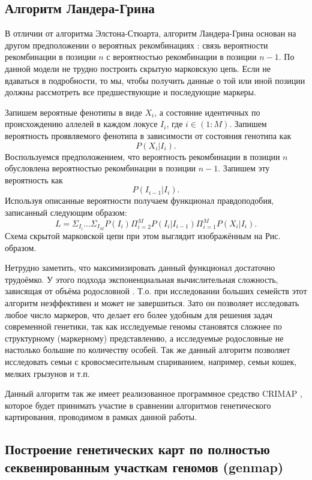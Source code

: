 \documentclass{matmex-diploma-custom}
\begin{document}
\subsection{Алгоритм Ландера-Грина}

В отличии от алгоритма Элстона-Стюарта, алгоритм Ландера-Грина основан
на другом предположении о вероятных рекомбинациях
\cite{lander1987construction}: связь вероятности рекомбинации в
позиции $n$ с вероятностью рекомбинации в позиции $n-1$. По данной
модели не трудно построить скрытую марковскую цепь. Если не вдаваться
в подробности, то мы, чтобы получить данные о той или иной позиции
должны рассмотреть все предшествующие и последующие маркеры.

Запишем вероятные фенотипы в виде $X_{i}$, а состояние идентичных по
происхождению аллелей в каждом локусе $I_{i}$, где $i \in
(1:M)$. Запишем вероятность проявляемого фенотипа в зависимости от
состояния генотипа как $$P( X_{i} | I_{i}).$$ Воспользуемся
предположением, что вероятность рекомбинации в позиции $n$ обусловлена
вероятностью рекомбинации в позиции $n-1$. Запишем эту вероятность
как $$P(I_{i-1}|I_{i}).$$ Используя описанные вероятности получаем
функционал правдоподобия, записанный следующим образом: $$L =
\Sigma_{I_{i}}...\Sigma_{I_{M}}P(I_{i})\Pi_{i=2}^{M}P(I_{i}|I_{i-1})\Pi^{M}_{i=1}P(X_{i}|I_{i}).$$
Схема скрытой марковской цепи при этом выглядит изображённым на
Рис. образом.

Нетрудно заметить, что максимизировать данный функционал достаточно
трудоёмко. У этого подхода экспоненциальная вычислительная сложность,
зависящая от объёма родословной \cite{lander,
  fishelson2002exact}. Т.о. при исследовании больших семейств этот
алгоритм неэффективен и может не завершиться. Зато он позволяет
исследовать любое число маркеров, что делает его более удобным для
решения задач современной генетики, так как исследуемые геномы
становятся сложнее по структурному (маркерному) представлению, а
исследуемые родословные не настолько большие по количеству особей. Так
же данный алгоритм позволяет исследовать семьи с кровосмесительным
спариванием, например, семьи кошек, мелких грызунов и т.п.

Данный алгоритм так же имеет реализованное программное средство CRIMAP
\cite{crimap}, которое будет принимать участие в сравнении алгоритмов
генетического картирования, проводимом в рамках данной работы.

\subsection{Построение генетических карт по полностью секвенированным
 участкам геномов (genmap)}
\end{document}
